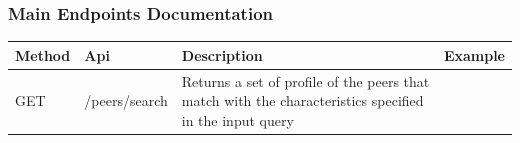 \subsubsection{Main Endpoints Documentation}

\begin{tabular}{llp{4cm}p{5cm}}
\toprule
Method & Api & Description & Example \\
\midrule
GET & /peers/search & Returns a set of profile of the peers that match with the characteristics specified in the input query & \\
\bottomrule
\end{tabular}











